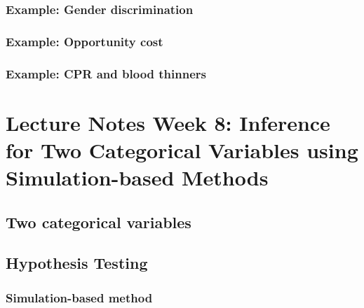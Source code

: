 \documentclass[
]{report}
\begin{document}
\hypertarget{example-gender-discrimination}{%
\subsubsection*{Example: Gender discrimination}\label{example-gender-discrimination}}

\hypertarget{example-opportunity-cost}{%
\subsubsection*{Example: Opportunity cost}\label{example-opportunity-cost}}

\hypertarget{example-cpr-and-blood-thinners}{%
\subsubsection*{Example: CPR and blood thinners}\label{example-cpr-and-blood-thinners}}

\hypertarget{lecture-notes-week-8-inference-for-two-categorical-variables-using-simulation-based-methods}{%
\section{Lecture Notes Week 8: Inference for Two Categorical Variables using Simulation-based Methods}\label{lecture-notes-week-8-inference-for-two-categorical-variables-using-simulation-based-methods}}

\hypertarget{two-categorical-variables}{%
\subsection*{Two categorical variables}\label{two-categorical-variables}}

\hypertarget{hypothesis-testing-2}{%
\subsection*{Hypothesis Testing}\label{hypothesis-testing-2}}

\hypertarget{simulation-based-method-2}{%
\subsubsection*{Simulation-based method}\label{simulation-based-method-2}}
\end{document}
